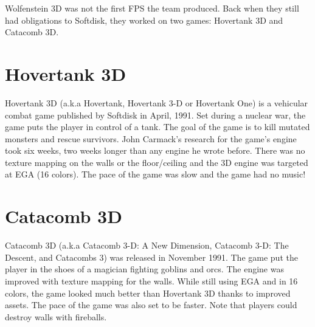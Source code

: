 Wolfenstein 3D was not the first FPS the team produced. Back when they still had obligations to Softdisk, they worked on two games: Hovertank 3D and Catacomb 3D.\\
\par
\section{Hovertank 3D}
Hovertank 3D (a.k.a Hovertank, Hovertank 3-D or Hovertank One) is a vehicular combat game published by Softdisk in April, 1991. Set during a nuclear war, the game puts the player in control of a tank. The goal of the game is to kill mutated monsters and rescue survivors. John Carmack's research for the game's engine took six weeks, two weeks longer than any engine he wrote before. There was no texture mapping on the walls or the floor/ceiling and the 3D engine was targeted at EGA (16 colors). The pace of the game was slow and the game had no music! \\
\par

\section{Catacomb 3D}
Catacomb 3D (a.k.a Catacomb 3-D: A New Dimension, Catacomb 3-D: The Descent, and Catacombs 3) was released in November 1991. The game put the player in the shoes of a magician fighting goblins and orcs. The engine was improved with texture mapping for the walls. While still using EGA and in 16 colors, the game looked much better than Hovertank 3D thanks to improved assets. The pace of the game was also set to be faster. Note that players could destroy walls with fireballs.\\
\par


\begin{minipage}{\textwidth}

\begin{figure}[H]
\centering
{}
\end{figure}

\begin{figure}[H]
\centering
{}
\end{figure}
\end{minipage}


\begin{minipage}{\textwidth}

\begin{figure}[H]
\centering
{}
\end{figure}

\begin{figure}[H]
\centering
{}
\end{figure}
\end{minipage}


